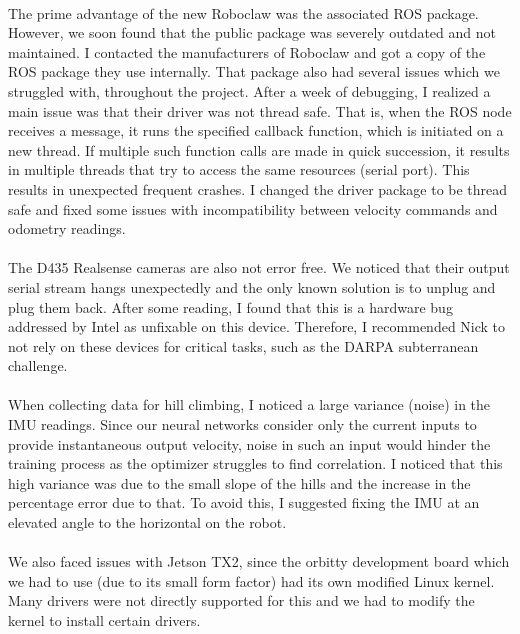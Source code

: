 \paragraph{}
The prime advantage of the new Roboclaw was the associated ROS package. However, we soon found that the public package was severely outdated and not maintained. I contacted the manufacturers of Roboclaw and got a copy of the ROS package they use internally. That package also had several issues which we struggled with, throughout the project. After a week of debugging, I realized a main issue was that their driver was not thread safe. That is, when the ROS node receives a message, it runs the specified callback function, which is initiated on a new thread. If multiple such function calls are made in quick succession, it results in multiple threads that try to access the same resources (serial port). This results in unexpected frequent crashes. I changed the driver package to be thread safe and fixed some issues with incompatibility between velocity commands and odometry readings.

\paragraph{}
The D435 Realsense cameras are also not error free. We noticed that their output serial stream hangs unexpectedly and the only known solution is to unplug and plug them back. After some reading, I found that this is a hardware bug addressed by Intel as unfixable on this device. Therefore, I recommended Nick to not rely on these devices for critical tasks, such as the DARPA subterranean challenge.

\paragraph{}
When collecting data for hill climbing, I noticed a large variance (noise) in the IMU readings. Since our neural networks consider only the current inputs to provide instantaneous output velocity, noise in such an input would hinder the training process as the optimizer struggles to find correlation. I noticed that this high variance was due to the small slope of the hills and the increase in the percentage error due to that. To avoid this, I suggested fixing the IMU at an elevated angle to the horizontal on the robot.

\paragraph{}
We also faced issues with Jetson TX2, since the orbitty development board which we had to use (due to its small form factor) had its own modified Linux kernel. Many drivers were not directly supported for this and we had to modify the kernel to install certain drivers.